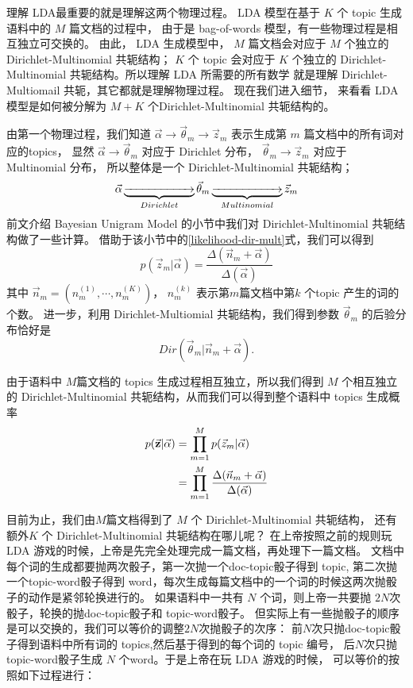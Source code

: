 理解 LDA最重要的就是理解这两个物理过程。 LDA 模型在基于 $K$ 个 topic
生成语料中的 $M$ 篇文档的过程中， 由于是 bag-of-words 模型，有一些物理过程是相互独立可交换的。
由此， LDA 生成模型中， $M$ 篇文档会对应于 $M$ 个独立的 Dirichlet-Multinomial 共轭结构；
$K$ 个 topic 会对应于 $K$ 个独立的 Dirichlet-Multinomial 共轭结构。所以理解 LDA 所需要的所有数学
就是理解 Dirichlet-Multiomail 共轭，其它都就是理解物理过程。
现在我们进入细节， 来看看 LDA 模型是如何被分解为 $M+K$ 个Dirichlet-Multinomial 共轭结构的。


由第一个物理过程，我们知道
$\vec{\alpha}\rightarrow \vec{\theta}_m \rightarrow  \vec{z}_{m}$
表示生成第 $m$ 篇文档中的所有词对应的topics，
显然  $\vec{\alpha}\rightarrow \vec{\theta}_m $ 对应于 Dirichlet 分布，
$\vec{\theta}_m \rightarrow  \vec{z}_{m}$ 对应于 Multinomial 分布， 所以整体是一个
Dirichlet-Multinomial 共轭结构；
$$ \vec{\alpha}\underbrace{\xrightarrow{\hspace*{2cm}}}_{Dirichlet} \vec{\theta}_m
\underbrace{\xrightarrow{\hspace*{2cm}}}_{Multinomial} \vec{z}_{m} $$
前文介绍 Bayesian Unigram Model 的小节中我们对 Dirichlet-Multinomial 共轭结构做了一些计算。
借助于该小节中的\eqref{likelihood-dir-mult}式，我们可以得到
$$ p(\vec{z}_m |\vec{\alpha}) = \frac{\Delta(\vec{n}_m+\vec{\alpha})}{\Delta(\vec{\alpha})} $$
其中 $\vec{n}_m = (n_{m}^{(1)}, \cdots, n_{m}^{(K)})$，
$n_{m}^{(k)}$ 表示第$m$篇文档中第$k$ 个topic 产生的词的个数。
进一步，利用 Dirichlet-Multiomial 共轭结构，我们得到参数 $\vec{\theta}_m$ 的后验分布恰好是
$$Dir(\vec{\theta}_m| \vec{n}_m + \vec{\alpha}).$$

由于语料中 $M$篇文档的 topics 生成过程相互独立，所以我们得到 $M$ 个相互独立的
Dirichlet-Multinomial 共轭结构，从而我们可以得到整个语料中 topics 生成概率
\begin{align}
\label{corpus-topic-prob}
p(\vec{\mathbf{z}} |\vec{\alpha}) & = \prod_{m=1}^M p(\vec{z}_m |\vec{\alpha}) \notag \\
&= \prod_{m=1}^M \frac{\Delta(\vec{n}_m+\vec{\alpha})}{\Delta(\vec{\alpha})}
\end{align}

目前为止，我们由$M$篇文档得到了 $M$ 个 Dirichlet-Multinomial 共轭结构，
还有额外$K$ 个 Dirichlet-Multinomial 共轭结构在哪儿呢？
在上帝按照之前的规则玩 LDA 游戏的时候，上帝是先完全处理完成一篇文档，再处理下一篇文档。
文档中每个词的生成都要抛两次骰子，第一次抛一个doc-topic骰子得到 topic,
第二次抛一个topic-word骰子得到 word，每次生成每篇文档中的一个词的时候这两次抛骰子的动作是紧邻轮换进行的。
如果语料中一共有 $N$ 个词，则上帝一共要抛 $2N$次骰子，轮换的抛doc-topic骰子和 topic-word骰子。
但实际上有一些抛骰子的顺序是可以交换的，我们可以等价的调整$2N$次抛骰子的次序：
前$N$次只抛doc-topic骰子得到语料中所有词的 topics,然后基于得到的每个词的 topic 编号，
后$N$次只抛topic-word骰子生成 $N$ 个word。于是上帝在玩 LDA 游戏的时候，
可以等价的按照如下过程进行：

